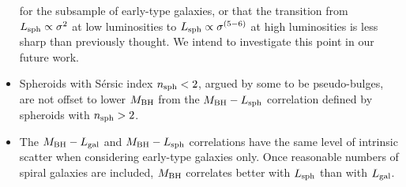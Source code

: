 \documentclass[preprint2]{emulateapj}
\begin{document}
\begin{itemize}
      for the subsample of early-type galaxies, 
      or that the transition from  $L_{\rm sph} \propto \sigma^2$ at low luminosities to $L_{\rm sph} \propto \sigma^{(5-6)}$ at high luminosities 
      is less sharp than previously thought.
      We intend to investigate this point in our future work. 
\item Spheroids with S\'ersic index $n_{\rm sph}<2$, argued by some to be pseudo-bulges, 
      are not offset to lower $M_{\rm BH}$ from the $M_{\rm BH} - L_{\rm sph}$ correlation defined by spheroids with $n_{\rm sph}>2$. 
\item The $M_{\rm BH} - L_{\rm gal}$ and $M_{\rm BH} - L_{\rm sph}$ correlations have the same level of intrinsic scatter 
      when considering early-type galaxies only. 
      Once reasonable numbers of spiral galaxies are included, 
      $M_{\rm BH}$ correlates better with $L_{\rm sph}$ than with $L_{\rm gal}$. 
\end{itemize} 
\end{document}
